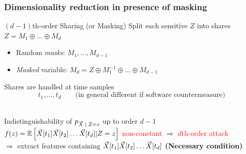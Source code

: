 



\begin{frame}
\frametitle{Dimensionality reduction in presence of masking}
\begin{block}{$(d-1)$th-order Sharing (or Masking)} 
Split each sensitive $Z$ into shares  $Z = M_1 \oplus \dots \oplus M_d$ 
\begin{itemize}
\item Random \emph{masks}: $M_1, \dots , M_{d-1}$  
\item \emph{Masked} variable: $M_d = Z \oplus M_1^{-1}\oplus \dots \oplus M_{d-1}$
\end{itemize}
Shares are handled at time samples $$t_1,\dots, t_d \qquad \text{(in general different if software countermeasure)} $$
\\
\end{block}

\begin{block}{Indistinguishability of $\pdf_{\given{\vaLeakVec}{\sensRandVar=\sensVar}}$  up to order $d-1$}
\pause
\textcolor{red}{$f(z) = \mathbb{E}\left[\vec{X}[t_1]\vec{X}[t_2]\dots\vec{X}[t_d]\lvert Z=z\right]$ non-constant} $\Rightarrow$ \textcolor{red}{$d$th-order attack} \\
\pause
$\Rightarrow$ extract features containing $\vec{X}[t_1]\vec{X}[t_2]\dots\vec{X}[t_d]$ \textbf{(Necessary condition)}
\end{block}

\end{frame}



